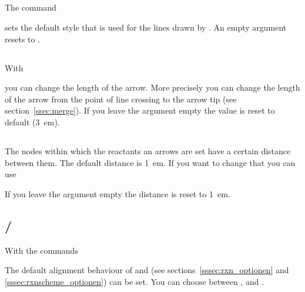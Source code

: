 \documentclass[toc=index,DIV10]{cnpkgdoc}
\begin{document}
\subsection{}\label{ssec:setelmove}
The command
\begin{beschreibung}
\end{beschreibung}
sets the default style that is used for the lines drawn by . An empty
argument resets to .

\subsection{}\label{ssec:setmergelength}
With
\begin{beschreibung}
\end{beschreibung}
you can change the length of the  arrow. More precisely you can change
the length of the arrow from the point of line crossing to the arrow tip (see
section~\ref{ssec:merge}). If you leave the argument empty the value is reset to
default (\SI{3}{em}).

\subsection{}\label{ssec:setrcndist}
The nodes within which the reactants an arrows are set have a certain distance
between them. The default distance is \SI{1}{em}. If you want to change that you
can use
\begin{beschreibung}
\end{beschreibung}
If you leave the argument empty the distance is reset to \SI{1}{em}.
\begin{beispiel}
 \setrcndist{2em}
 \begin{rxn}
  \arrow{}{}
 \end{rxn}
 \setrcndist{}
 \begin{rxn}
  \arrow{}{}
 \end{rxn}
\end{beispiel}

\subsection{/}\label{ssec:setrxnalign}\label{ssec:setschemealign}
With the commands
\begin{beschreibung}
\end{beschreibung}
The default alignment behaviour of  and  (see
sections~\ref{sssec:rxn_optionen} and \ref{sssec:rxnscheme_optionen}) can be set.
You can choose between ,  and .
\end{document}
